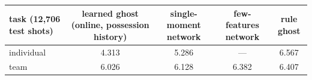 \begin{tabular}{lcccc}
\hline
task (12,706 test shots) & learned ghost (online, possession history) & single-moment network & few-features network & rule ghost \\
\hline
individual & 4.313 & 5.286 & --- & 6.567 \\
team & 6.026 & 6.128 & 6.382 & 6.407 \\
\hline
\end{tabular}
